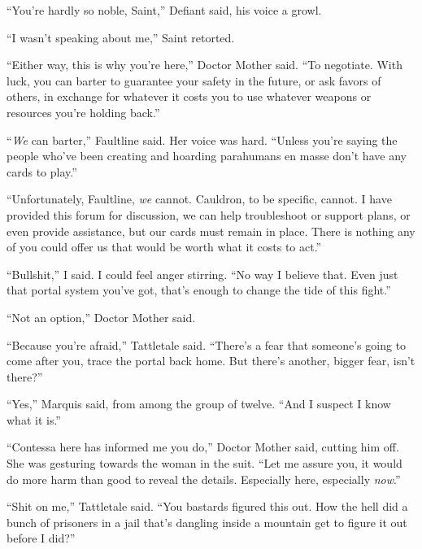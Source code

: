 ``You're hardly so noble, Saint,'' Defiant said, his voice a growl.



``I wasn't speaking about me,'' Saint retorted.



``Either way, this is why you're here,'' Doctor Mother said.  ``To negotiate.  With luck, you can barter to guarantee your safety in the future, or ask favors of others, in exchange for whatever it costs you to use whatever weapons or resources you're holding back.''



``\emph{We} can barter,'' Faultline said.  Her voice was hard.  ``Unless you're saying the people who've been creating and hoarding parahumans en masse don't have any cards to play.''



``Unfortunately, Faultline, \emph{we} cannot.  Cauldron, to be specific, cannot.  I have provided this forum for discussion, we can help troubleshoot or support plans, or even provide assistance, but our cards must remain in place.  There is nothing any of you could offer us that would be worth what it costs to act.''



``Bullshit,'' I said.  I could feel anger stirring.  ``No way I believe that.  Even just that portal system you've got, that's enough to change the tide of this fight.''



``Not an option,'' Doctor Mother said.



``Because you're afraid,'' Tattletale said.  ``There's a fear that someone's going to come after you, trace the portal back home.  But there's another, bigger fear, isn't there?''



``Yes,'' Marquis said, from among the group of twelve.  ``And I suspect I know what it is.''



``Contessa here has informed me you do,'' Doctor Mother said, cutting him off.  She was gesturing towards the woman in the suit.  ``Let me assure you, it would do more harm than good to reveal the details.  Especially here, especially \emph{now}.''



``Shit on me,'' Tattletale said.  ``You bastards figured this out.  How the hell did a bunch of prisoners in a jail that's dangling inside a mountain get to figure it out before I did?''




